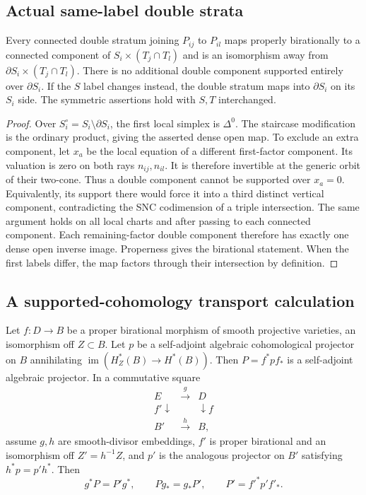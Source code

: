 \subsection{Actual same-label double strata}

\begin{lemma}
\label{r20px:double}
Every connected double stratum joining $P_{ij}$ to $P_{il}$ maps
properly birationally to a connected component of
$S_i\times (T_j\cap T_l)$ and is an isomorphism away from
$\partial S_i\times (T_j\cap T_l)$. There is no additional
double component supported entirely over $\partial S_i$.
If the $S$ label changes instead, the double stratum maps into
$\partial S_i$ on its $S_i$ side. The symmetric assertions hold
with $S,T$ interchanged.
\end{lemma}

\begin{proof}
Over $S_i^{\circ}=S_i\setminus\partial S_i$, the first local
simplex is $\Delta^0$. The staircase modification is the ordinary
product, giving the asserted dense open map. To exclude an extra
component, let $x_a$ be the local equation of a different first-factor
component. Its valuation is zero on both rays $n_{ij},n_{il}$.
It is therefore invertible at the generic orbit of their two-cone.
Thus a double component cannot be supported over $x_a=0$.
Equivalently, its support there would force it into a third distinct
vertical component, contradicting the SNC codimension of a triple
intersection. The same argument holds on all local charts and after
passing to each connected component. Each remaining-factor double
component therefore has exactly one dense open inverse image.
Properness gives the birational statement. When the first labels
differ, the map factors through their intersection by definition.
\end{proof}

\subsection{A supported-cohomology transport calculation}

\begin{lemma}
\label{r20px:transport}
Let $f:D\to B$ be a proper birational morphism of smooth projective
varieties, an isomorphism off $Z\subset B$. Let $p$ be a self-adjoint
algebraic cohomological projector on $B$ annihilating
$\operatorname{im}(H_Z^*(B)\to H^*(B))$. Then $P=f^*pf_*$ is
a self-adjoint algebraic projector. In a commutative square
\[
\begin{matrix}
 E&\xrightarrow{g}&D\\
 f'\downarrow&&\downarrow f\\
 B'&\xrightarrow{h}&B,
\end{matrix}
 \tag{PX20.7}
\]
assume $g,h$ are smooth-divisor embeddings, $f'$ is proper
birational and an isomorphism off $Z'=h^{-1}Z$, and $p'$ is the
analogous projector on $B'$ satisfying $h^*p=p'h^*$. Then
\[
 g^*P=P'g^*,\qquad Pg_*=g_*P',\qquad P'=f'^*p'f'_*.
 \tag{PX20.8}
\]
\end{lemma}

